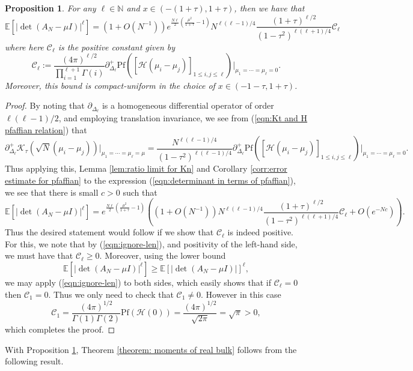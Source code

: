 \documentclass[12pt]{article}
\newcommand{\N}{\mathbb{N}}
\newcommand{\E}{\mathbb{E}}
\newtheorem{prop}[info]{Proposition}
\numberwithin{info}{section}
\numberwithin{equation}{section}
\renewcommand{\[}{\begin{equation}}
\renewcommand{\]}{\end{equation}}
\renewcommand{\cal}{\mathcal}
\newcommand{\<}{\langle}
\renewcommand{\>}{\rangle}
\newcommand{\pf}{\mathrm{Pf}}
\begin{document}
	\begin{prop}
		\label{prop:main prop}
		For any $\ell\in \N$ and $x\in (-(1+\tau),1+\tau)$, then we have that
		\[\E[|\det(A_N-\mu I)|^{\ell}]=\left(1+O(N^{-1})\right)e^{\frac{N\ell}{2} \left(\frac{\mu^2}{1+\tau}-1\right)}N^{\ell(\ell-1)/4}\frac{ (1+\tau)^{\ell/2}}{(1-\tau^2)^{\ell(\ell+1)/4}}\cal{C}_{\ell}\]
		where here $\cal{C}_{\ell}$ is the positive constant given by
		\[\cal{C}_{\ell}:=\frac{\left(4\pi\right)^{\ell/2}}{\prod_{i=1}^{\ell+1}\Gamma(i)}\partial_{\Delta_\ell}^+\pf([\cal{H}(\mu_i-\mu_j)]_{1\le i,j\le \ell})\big|_{\mu_1=\cdots=\mu_\ell=0}.\]
		Moreover, this bound is compact-uniform in the choice of $x\in (-1-\tau,1+\tau)$.
	\end{prop}
	\begin{proof}
		By noting that $\partial_{\Delta_\ell}$ is a homogeneous differential operator of order $\ell(\ell-1)/2$, and employing translation invariance, we see from (\ref{eqn:Kt and H pfaffian relation}) that
		\[
		\partial_{\Delta_\ell}^+\cal{K}_\tau(\sqrt{N}(\mu_i-\mu_j))\big|_{\mu_1=\cdots=\mu_\ell=\mu}=\frac{N^{\ell(\ell-1)/4}}{(1-\tau^2)^{\ell(\ell-1)/4}}\partial_{\Delta_\ell}^+\pf([\cal{H}(\mu_i-\mu_j)]_{1\le i,j\le \ell})\big|_{\mu_1=\cdots=\mu_\ell=0}.
		\]
		Thus applying this, Lemma \ref{lem:ratio limit for Kn} and Corollary \ref{corr:error estimate for pfaffian} to the expression (\ref{eqn:determinant in terms of pfaffian}), we see that there is small $c>0$ such that
		\[
		\E\left[\left|\det(A_{N}-\mu I)\right|^{\ell}\right]=e^{\frac{N\ell}{2} \left(\frac{\mu^2}{1+\tau}-1\right)}\left((1+O\left(N^{-1}\right))N^{\ell(\ell-1)/4}\frac{ (1+\tau)^{\ell/2}}{(1-\tau^2)^{\ell(\ell+1)/4}}\cal{C}_{\ell}+O\left(e^{-Nc}\right)\right).\label{eqn:ignore-len}
		\]
		Thus the desired statement would follow if we show that $\cal{C}_\ell$ is indeed positive. For this, we note that by (\ref{eqn:ignore-len}), and positivity of the left-hand side, we must have that $\cal{C}_\ell\ge 0$. Moreover, using the lower bound
		\[\E[|\det(A_N-\mu I)|^{\ell}]\ge \E[|\det(A_N-\mu I)|]^{\ell},\]
		we may apply (\ref{eqn:ignore-len}) to both sides, which easily shows that if $\cal{C}_\ell=0$ then $\cal{C}_1=0$. Thus we only need to check that $\cal{C}_1\neq 0$. However in this case
		\[\cal{C}_1=\frac{\left(4\pi\right)^{1/2}}{\Gamma(1)\Gamma(2)}\pf(\cal{H}(0))=\frac{(4\pi)^{1/2}}{\sqrt{2\pi}}=\sqrt{\pi}>0,\]
		which completes the proof.
	\end{proof}
	
	With Proposition \ref{prop:main prop}, Theorem \ref{theorem: moments of real bulk} follows from the following result.
	
\end{document}
